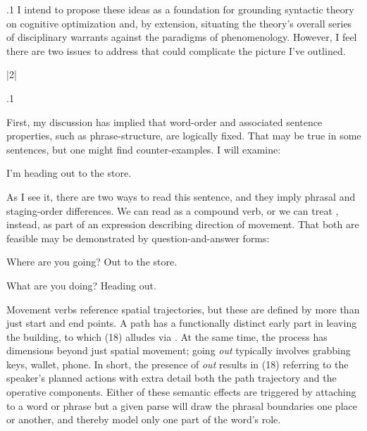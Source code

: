 \documentclass[11pt, twocolumn]{article}
\begin{document}
{{\p.1{%
I intend to propose these ideas as a foundation for
grounding syntactic theory on cognitive optimization
\mdash{} and, by extension, situating the theory's overall
series of disciplinary warrants against the paradigms
of phenomenology. However, I feel there are two
issues to address that could complicate the picture
I've outlined. \upAdj{14pt}
}%


\s|2|{}

\p.1{%
First, my discussion has implied that word-order and associated
sentence properties, such as phrase-structure, are logically
fixed. \pgl{}That
may be true in some sentences, but one might find
counter-examples. I will examine:

\begin{exsGroup}

\exsItem{}  I'm heading out to the store.

\end{exsGroup}

\nip{}%
As I see it, there are two ways to read this sentence, and they imply phrasal
and staging-order differences. We can read  as a compound
verb, or we can treat , instead, as part of an expression describing
direction of movement. That both are feasible may be demonstrated by
question-and-answer forms:

\begin{exsGroup}

\exsItem{}  Where are you going? Out to the store.

\exsItem{}  What are you doing? Heading out.

\end{exsGroup}

\nip{}%
Movement verbs reference spatial trajectories, but these are
defined by more than just start and end points. A path
 has a functionally distinct early part in leaving
the building, to which \exsRef(18) alludes via . At the same time,
the process has dimensions beyond just spatial movement; going
\textit{out} typically involves grabbing keys, wallet, phone.
In short, the presence of \textit{out} results in \exsRef(18) referring to
the speaker's planned actions with extra detail both \visavis{} the
path trajectory and the operative components. Either of these
semantic effects are triggered by attaching  to a word
or phrase \mdash{} but a given parse will draw the phrasal boundaries
one place or another, and thereby model only one part of the word's role.
}%

}}
\end{document}
